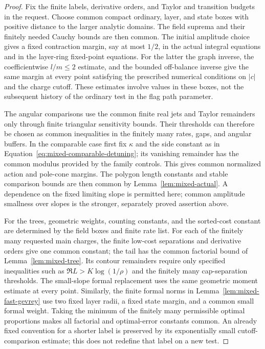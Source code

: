 \begin{proof}
Fix the finite labels, derivative orders, and Taylor and transition
budgets in the request. Choose common compact ordinary, layer, and
state boxes with positive distance to the larger analytic domains.
The field suprema and their finitely needed Cauchy bounds are then
common. The initial amplitude choice gives a fixed contraction
margin, say at most $1/2$, in the actual integral equations and
in the layer-ring fixed-point equations. For the latter the graph
inverse, the coefficientwise $l/m\leq2$ estimate, and the bounded
off-balance inverse give the same margin at every point satisfying
the prescribed numerical conditions on $|c|$ and the charge cutoff.
These estimates involve values in these boxes, not the subsequent
history of the ordinary test in the flag path parameter.

The angular comparisons use the common finite real jets and Taylor
remainders only through finite triangular sensitivity bounds.
Their thresholds can therefore be chosen as common inequalities
in the finitely many rates, gaps, and angular buffers. In the
comparable case first fix $\kappa$ and the side constant as in
Equation~\eqref{eq:mixed-comparable-detuning}; its vanishing
remainder has the common modulus provided by the family controls.
This gives common normalized action and pole-cone margins. The
polygon length constants and stable comparison bounds are then
common by Lemma~\ref{lem:mixed-actual}. A dependence on the fixed
limiting slope is permitted here; common amplitude smallness over
slopes is the stronger, separately proved assertion above.

For the trees, geometric weights, counting constants, and the
sorted-cost constant are determined by the field boxes and finite
rate list. For each of the finitely many requested main charges,
the finite low-cost separations and derivative orders give one
common constant; the tail has the common factorial bound of
Lemma~\ref{lem:mixed-tree}. Its contour remainders require only
specified inequalities such as
$\Re L>K\log(1/\rho)$ and the finitely many cap-separation
thresholds. The small-slope formal replacement uses the same
geometric moment estimate at every point. Similarly, the finite
formal norms in Lemma~\ref{lem:mixed-fast-gevrey} use two fixed
layer radii, a fixed state margin, and a common small formal
weight. Taking the minimum of the finitely many permissible
optimal proportions makes all factorial and optimal-error
constants common. An already fixed convention for a shorter
label is preserved by its exponentially small cutoff-comparison
estimate; this does not redefine that label on a new test.


\end{proof}
